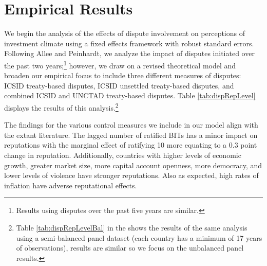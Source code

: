 \documentclass[12pt,onesided]{amsart}
\begin{document}
\section*{Empirical Results}

We begin the analysis of the effects of dispute involvement on perceptions of investment climate using a fixed effects framework with robust standard errors. Following Allee and Peinhardt, we analyze the impact of disputes initiated over the past two years;\footnote{Results using disputes over the past five years are similar.} however, we draw on a revised theoretical model and broaden our empirical focus to include three different measures of disputes: ICSID treaty-based disputes, ICSID unsettled treaty-based disputes, and combined ICSID and UNCTAD treaty-based disputes. Table \ref{tab:dispRepLevel} displays the results of this analysis.\footnote{Table \ref{tab:dispRepLevelBal} in the  shows the results of the same analysis using a semi-balanced panel dataset (each country has a minimum of 17 years of observations), results are similar so we focus on the unbalanced panel results. }

The findings for the various control measures we include in our model align with the extant literature. The lagged number of ratified BITs has a minor impact on reputations with the marginal effect of ratifying 10 more equating to a 0.3 point change in reputation. Additionally, countries with higher levels of economic growth, greater market size, more capital account openness, more democracy, and lower levels of violence have stronger reputations. Also as expected, high rates of inflation have adverse reputational effects.

\end{document}
